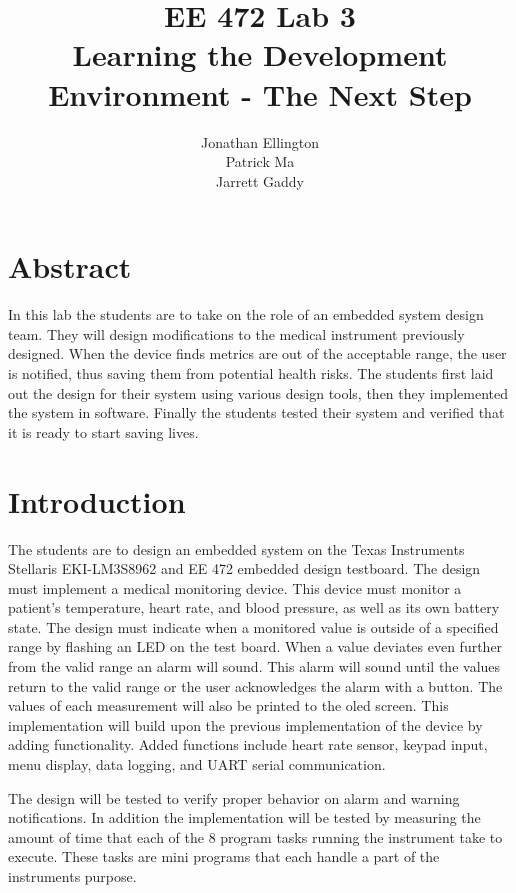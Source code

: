 \documentclass[12pt]{article} %
\title{\TitleFont EE 472 Lab 3 \\ Learning the Development Environment - The Next Step \vfill }
\author{\AuthorFont Jonathan Ellington \\ Patrick Ma \\ Jarrett Gaddy}
\date{}
\begin{document}
\maketitle
\thispagestyle{empty}
\pagebreak
\tableofcontents
\listoftables
\listoffigures
\thispagestyle{empty}
\pagebreak
\setcounter{page}{1}


\section{Abstract} In this lab the students are to take on the role of an
embedded system design team. They will design modifications to the medical
instrument previously designed. When the device finds metrics
are out of the acceptable range, the user is notified, thus saving them
from potential health risks. The students first laid out the design for
their system using various design tools, then they implemented the system in
software. Finally the students tested their system and verified that it is
ready to start saving lives. 

\section{Introduction}
The students are to design an embedded system on the Texas Instruments
Stellaris EKI-LM3S8962 and EE 472 embedded design testboard. The design must
implement a medical monitoring device. This device must monitor a patient's
temperature, heart rate, and blood pressure, as well as its own battery state.
The design must indicate when a monitored value is outside of a specified range
by flashing an LED on the test board. When a value deviates even further from
the valid range an alarm will sound. This alarm will sound until the values
return to the valid range or the user acknowledges the alarm with a button. The
values of each measurement will also be printed to the oled screen. This implementation will build upon the previous implementation of the device by adding functionality. Added functions include heart rate sensor, keypad input, menu display, data logging, and UART serial communication.

The design will be tested to verify proper behavior on alarm and warning notifications. In addition the implementation will be tested by measuring the amount of time that each of the 8 program tasks running the instrument take to execute. These tasks are mini programs that each handle a part of the instruments purpose.
\end{document}
